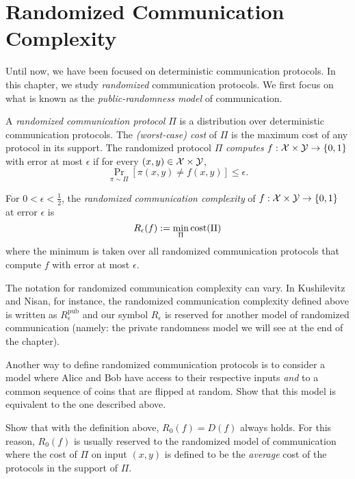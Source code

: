 \chapter[Randomized Complexity]{Randomized Communication Complexity}
Until now, we have been focused on deterministic communication protocols. In this chapter, we study \emph{randomized} communication protocols. We first focus on what is known as the \emph{public-randomness model} of communication. 

\begin{definition}
A \emph{randomized communication protocol} $\Pi$ is a distribution over deterministic communication protocols. The \emph{(worst-case) cost} of $\Pi$ is the maximum cost of any protocol in its support. The randomized protocol $\Pi$ \emph{computes} $f : \mathcal{X} \times \mathcal{Y} \to \{0,1\}$ with error at most $\epsilon$ if for every $(x,y) \in \mathcal{X} \times \mathcal{Y}$,
\[
\Pr_{\pi \sim \Pi}[ \pi(x,y) \neq f(x,y) ] \le \epsilon.
\]
\end{definition}


\begin{definition}
For $0 < \epsilon < \frac12$, the \emph{randomized communication complexity} of $f : \mathcal{X} \times \mathcal{Y} \to \{0,1\}$ at error $\epsilon$ is
\[
R_\epsilon(f) := \min_{\Pi} \mathrm{cost}(\Pi)
\]
where the minimum is taken over all randomized communication protocols that compute $f$ with error at most $\epsilon$.
\end{definition}

\begin{remark}
The notation for randomized communication complexity can vary. In Kushilevitz and Nisan, for instance, the randomized communication complexity defined above is written as $R^{\mathrm{pub}}_\epsilon$ and our symbol $R_\epsilon$ is reserved for another model of randomized communication (namely: the private randomness model we will see at the end of the chapter).
\end{remark}

\exercises

\begin{exercise}
Another way to define randomized communication protocols is to consider a model where Alice and Bob have access to their respective inputs \emph{and} to a common sequence of coins that are flipped at random. Show that this model is equivalent to the one described above.
\end{exercise}

\begin{exercise}
Show that with the definition above, $R_0(f) = D(f)$ always holds. For this reason, $R_0(f)$ is usually reserved to the randomized model of communication where the cost of $\Pi$ on input $(x,y)$ is defined to be the \emph{average} cost of the protocols in the support of $\Pi$.
\end{exercise}


